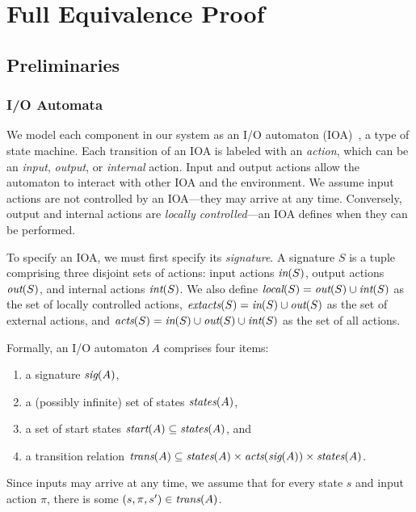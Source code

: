 \section{Full Equivalence Proof}
\label{sec:equivalence}

\subsection{Preliminaries}
\label{sec:equivalence:preliminaries}

\subsubsection{I/O Automata}
\label{sec:equivalence:preliminaries:ioa}

We model each component in our system as an I/O automaton
(IOA)~\cite{lynch1987ioa,lynch1996da}, a type of state machine. Each
transition of an IOA is labeled with an \textit{action}, which can be an
\textit{input}, \textit{output}, or \textit{internal} action. Input and output
actions allow the automaton to interact with other IOA and the environment. We
assume input actions are not controlled by an IOA---they may arrive at any time.
Conversely, output and internal actions are \textit{locally controlled}---an IOA defines
when they can be performed.

To specify an IOA, we must first specify its \textit{signature}. A signature $S$ is
a tuple comprising three disjoint sets of actions: input actions $\operatorname*{\textit{in}}(S)$,
output actions $\operatorname*{\textit{out}}(S)$, and internal actions $\operatorname*{\textit{int}}(S)$. We also define
$\operatorname*{\textit{local}}(S) = \operatorname*{\textit{out}}(S) \cup \operatorname*{\textit{int}}(S)$ as the set of locally controlled actions, $\operatorname*{\textit{extacts}}(S) = \operatorname*{\textit{in}}(S) \cup \operatorname*{\textit{out}}(S)$ as the set of external actions, and $\operatorname*{\textit{acts}}(S) = \operatorname*{\textit{in}}(S) \cup \operatorname*{\textit{out}}(S) \cup \operatorname*{\textit{int}}(S)$ as the set of all actions.

Formally, an I/O automaton $A$ comprises four items:
\begin{enumerate}
\item a signature $\operatorname*{\textit{sig}}(A)$,
\item a (possibly infinite) set of states $\operatorname*{\textit{states}}(A)$,
\item a set of start states $\operatorname*{\textit{start}}(A) \subseteq \operatorname*{\textit{states}}(A)$, and
\item a transition relation $\operatorname*{\textit{trans}}(A) \subseteq \operatorname*{\textit{states}}(A) \times
  \operatorname*{\textit{acts}}(\operatorname*{\textit{sig}}(A)) \times \operatorname*{\textit{states}}(A)$.
\end{enumerate}
Since inputs may arrive at any time, we assume that for every state $s$ and
input action $\pi$, there is some $(s, \pi, s^\prime) \in \operatorname*{\textit{trans}}(A)$.

